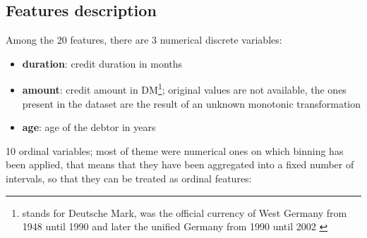 \documentclass[letterpaper]{article}
\begin{document}
	\subsection{Features description}
	Among the 20 features, there are 3 numerical discrete variables:
	\begin{itemize}
		\item \textbf{duration}: credit duration in months
		\item \textbf{amount}: credit amount in DM\footnote{stands for Deutsche Mark, was the official currency of West Germany from 1948 until 1990 and later the unified Germany from 1990 until 2002 \cite{dm}}; original values are not available, the ones present in the dataset are the result of an unknown monotonic transformation
		\item \textbf{age}: age of the debtor in years
	\end{itemize}
	10 ordinal variables; most of theme were numerical ones on which binning has been applied, that means that they have been aggregated into a fixed number of intervals, so that they can be treated as ordinal features:
\end{document}
